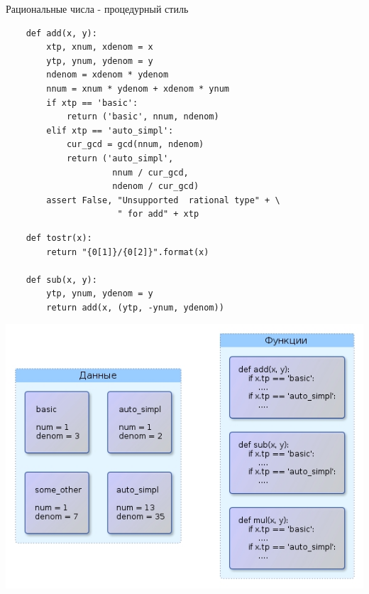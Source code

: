 \documentclass{article}
\begin{document}
\begin{center}Рациональные числа - процедурный стиль\end{center}
\begin{lstlisting}
    def add(x, y):
        xtp, xnum, xdenom = x
        ytp, ynum, ydenom = y
        ndenom = xdenom * ydenom
        nnum = xnum * ydenom + xdenom * ynum
        if xtp == 'basic':
            return ('basic', nnum, ndenom)
        elif xtp == 'auto_simpl':
            cur_gcd = gcd(nnum, ndenom)
            return ('auto_simpl', 
                     nnum / cur_gcd, 
                     ndenom / cur_gcd)
        assert False, "Unsupported  rational type" + \
                      " for add" + xtp
\end{lstlisting}
\newpage

\begin{lstlisting}
    def tostr(x): 
        return "{0[1]}/{0[2]}".format(x)

    def sub(x, y):
        ytp, ynum, ydenom = y
        return add(x, (ytp, -ynum, ydenom))
\end{lstlisting}
\newpage

\begin{center} \includegraphics{images/procedural_style.jpg} \end{center} 
\newpage
\end{document}

